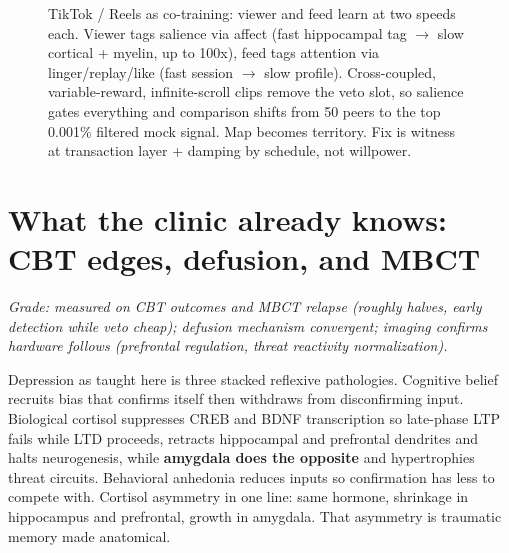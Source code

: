 \begin{figure}[h]
\caption{TikTok / Reels as co-training: viewer and feed learn at two speeds each. Viewer tags salience via affect (fast hippocampal tag $\to$ slow cortical + myelin, up to 100x), feed tags attention via linger/replay/like (fast session $\to$ slow profile). Cross-coupled, variable-reward, infinite-scroll clips remove the veto slot, so salience gates everything and comparison shifts from 50 peers to the top 0.001\% filtered mock signal. Map becomes territory. Fix is witness at transaction layer + damping by schedule, not willpower.}
\label{fig:tiktok-cotrain-ch8}
\end{figure}

\section{What the clinic already knows: CBT edges, defusion, and MBCT}
\label{sec:cbt-edges}

\textit{Grade: measured on CBT outcomes and MBCT relapse (roughly halves, early detection while veto cheap); defusion mechanism convergent; imaging confirms hardware follows (prefrontal regulation, threat reactivity normalization).}

Depression as taught here is three stacked reflexive pathologies. Cognitive belief recruits bias that confirms itself then withdraws from disconfirming input. Biological cortisol suppresses CREB and BDNF transcription so late-phase LTP fails while LTD proceeds, retracts hippocampal and prefrontal dendrites and halts neurogenesis, while \textbf{amygdala does the opposite} and hypertrophies threat circuits. Behavioral anhedonia reduces inputs so confirmation has less to compete with. Cortisol asymmetry in one line: same hormone, shrinkage in hippocampus and prefrontal, growth in amygdala. That asymmetry is traumatic memory made anatomical.

